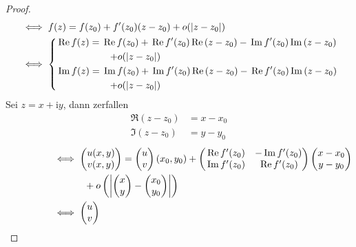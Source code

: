 \begin{theorem}[Satz]
  \begin{proof}
    \begin{align*}
      &\iff f(z) = f(z_0) + f'(z_0)(z-z_0) + o(|z-z_0|) \\
      &\iff
      \begin{dcases}
        \Re f(z) = \Re f(z_0) + \Re f'(z_0) \Re (z-z_0) - \Im f'(z_0) \Im (z-z_0) \\ \mspace{100mu} + o(|z-z_0|) \\
        \Im f(z) = \Im f(z_0) + \Im f'(z_0) \Re (z-z_0) - \Re f'(z_0) \Im (z-z_0) \\ \mspace{100mu} + o(|z-z_0|)
      \end{dcases}
    \end{align*}
    Sei $z = x + \mathrm{i} y$, dann zerfallen
    \begin{align*}
      \Re (z-z_0) &= x - x_0 \\
      \Im (z-z_0) &= y - y_0
    \end{align*}
    \begin{align*}
      \phantom{\text{\ref{itm:2.20 i}}} &\iff
      \begin{pmatrix}
        u(x,y) \\ v(x,y)
      \end{pmatrix}
      =
      \begin{pmatrix}
        u \\ v
      \end{pmatrix}
      (x_0,y_0) +
      \begin{pmatrix}
        \Re f'(z_0) & -\Im f'(z_0) \\
        \Im f'(z_0) & \Re f'(z_0)
      \end{pmatrix}
      \begin{pmatrix}
        x-x_0 \\
        y-y_0
      \end{pmatrix}\\
      &\phantom{\iff\quad}
      +
      o
      \left(\left|
      \begin{pmatrix}
        x \\ y
      \end{pmatrix}
      -
      \begin{pmatrix}
        x_0 \\ y_0
      \end{pmatrix}
      \right|\right) \\
      &\iff
      \begin{pmatrix}
        u \\ v

\end{pmatrix}
\end{align*}
\end{proof}
\end{theorem}

